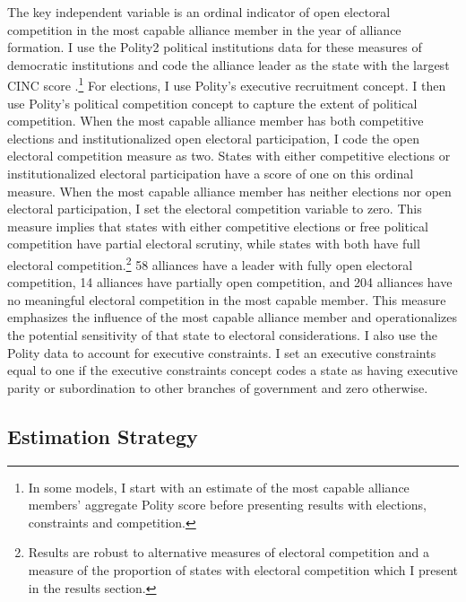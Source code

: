 \documentclass[12pt]{article}
\begin{document}
The key independent variable is an ordinal indicator of open electoral competition in the most capable alliance member in the year of alliance formation. 
I use the Polity2 political institutions data for these measures of democratic institutions and code the alliance leader as the state with the largest CINC score \citep{SingerCINC1988}.\footnote{In some models, I start with an estimate of the most capable alliance members' aggregate Polity score before presenting results with elections, constraints and competition.}
For elections, I use Polity's executive recruitment concept. 
I then use Polity's political competition concept to capture the extent of political competition. 
When the most capable alliance member has both competitive elections and institutionalized open electoral participation, I code the open electoral competition measure as two.
States with either competitive elections or institutionalized electoral participation have a score of one on this ordinal measure. 
When the most capable alliance member has neither elections nor open electoral participation, I set the electoral competition variable to zero.
This measure implies that states with either competitive elections or free political competition have partial electoral scrutiny, while states with both have full electoral competition.\footnote{Results are robust to alternative measures of electoral competition and a measure of the proportion of states with electoral competition which I present in the results section.}
58 alliances have a leader with fully open electoral competition, 14 alliances have partially open competition, and 204 alliances have no meaningful electoral competition in the most capable member. 
This measure emphasizes the influence of the most capable alliance member and operationalizes the potential sensitivity of that state to electoral considerations.   
I also use the Polity data to account for executive constraints.
I set an executive constraints equal to one if the executive constraints concept codes a state as having executive parity or subordination to other branches of government and zero otherwise.



\subsection{Estimation Strategy}
\end{document}
